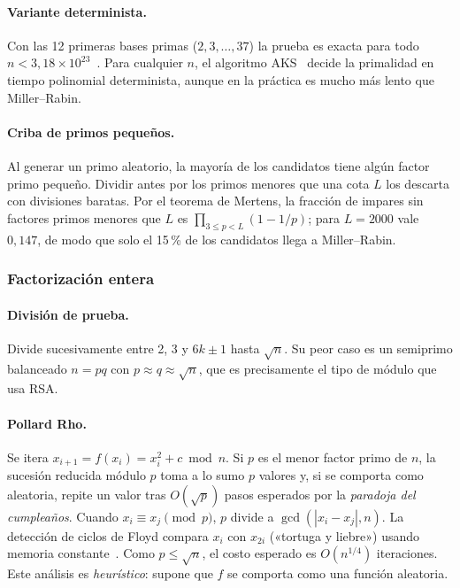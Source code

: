 \paragraph{Variante determinista.} Con las 12 primeras bases primas
($2, 3, \dots, 37$) la prueba es exacta para todo
$n < 3{,}18 \times 10^{23}$~\cite{sorenson2017}. Para cualquier $n$, el
algoritmo AKS~\cite{aks2004} decide la primalidad en tiempo polinomial
determinista, aunque en la práctica es mucho más lento que Miller--Rabin.

\paragraph{Criba de primos pequeños.} Al generar un primo aleatorio, la
mayoría de los candidatos tiene algún factor primo pequeño. Dividir antes por
los primos menores que una cota $L$ los descarta con divisiones baratas. Por el
teorema de Mertens, la fracción de impares sin factores primos menores que $L$
es $\prod_{3 \le p < L}(1 - 1/p)$; para $L = 2000$ vale $0{,}147$, de modo que
solo el 15\,\% de los candidatos llega a Miller--Rabin.

\subsubsection{Factorización entera}

\paragraph{División de prueba.} Divide sucesivamente entre 2, 3 y $6k \pm 1$
hasta $\sqrt n$. Su peor caso es un semiprimo balanceado $n = pq$ con
$p \approx q \approx \sqrt n$, que es precisamente el tipo de módulo que usa
RSA.

\paragraph{Pollard Rho.} Se itera $x_{i+1} = f(x_i) = x_i^2 + c \bmod n$. Si
$p$ es el menor factor primo de $n$, la sucesión reducida módulo $p$ toma a
lo sumo $p$ valores y, si se comporta como aleatoria, repite un valor tras
$O(\sqrt p)$ pasos esperados por la \emph{paradoja del cumpleaños}. Cuando
$x_i \equiv x_j \pmod p$, $p$ divide a $\gcd(|x_i - x_j|, n)$. La detección
de ciclos de Floyd compara $x_i$ con $x_{2i}$ («tortuga y liebre») usando
memoria constante~\cite{pollard1975}. Como $p \le \sqrt n$, el costo esperado
es $O(n^{1/4})$ iteraciones. Este análisis es \emph{heurístico}: supone que
$f$ se comporta como una función aleatoria.

